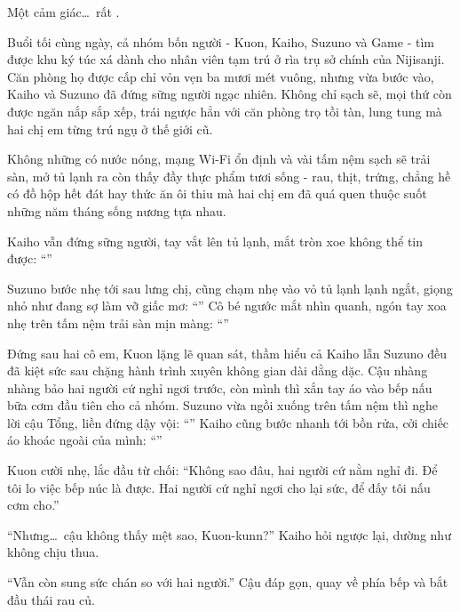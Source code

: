\documentclass[../main.tex]{subfiles}
\begin{document}
Một cảm giác\dots\ rất \hll.

\ct

Buổi tối cùng ngày, cả nhóm bốn người - Kuon, Kaiho, Suzuno và Game - tìm được khu ký túc xá dành cho nhân viên tạm trú ở rìa trụ sở chính của Nijisanji. Căn phòng họ được cấp chỉ vỏn vẹn ba mươi mét vuông, nhưng vừa bước vào, Kaiho và Suzuno đã đứng sững người ngạc nhiên. Không chỉ sạch sẽ, mọi thứ còn được ngăn nắp sắp xếp, trái ngược hẳn với căn phòng trọ tồi tàn, lung tung mà hai chị em từng trú ngụ ở thế giới cũ.

Không những có nước nóng, mạng Wi-Fi ổn định và vài tấm nệm sạch sẽ trải sàn, mở tủ lạnh ra còn thấy đầy thực phẩm tươi sống - rau, thịt, trứng, chẳng hề có đồ hộp hết đát hay thức ăn ôi thiu mà hai chị em đã quá quen thuộc suốt những năm tháng sống nương tựa nhau.

Kaiho vẫn đứng sững người, tay vắt lên tủ lạnh, mắt tròn xoe không thể tin được: ``''

Suzuno bước nhẹ tới sau lưng chị, cũng chạm nhẹ vào vỏ tủ lạnh lạnh ngắt, giọng nhỏ như đang sợ làm vỡ giấc mơ: ``'' Cô bé ngước mắt nhìn quanh, ngón tay xoa nhẹ trên tấm nệm trải sàn mịn màng: ``''

Đứng sau hai cô em, Kuon lặng lẽ quan sát, thầm hiểu cả Kaiho lẫn Suzuno đều đã kiệt sức sau chặng hành trình xuyên không gian dài dằng dặc. Cậu nhàng nhàng bảo hai người cứ nghỉ ngơi trước, còn mình thì xắn tay áo vào bếp nấu bữa cơm đầu tiên cho cả nhóm. Suzuno vừa ngồi xuống trên tấm nệm thì nghe lời cậu Tổng, liền đứng dậy vội: ``'' Kaiho cũng bước nhanh tới bồn rửa, cởi chiếc áo khoác ngoài của mình: ``''

Kuon cười nhẹ, lắc đầu từ chối: ``Không sao đâu, hai người cứ nằm nghỉ đi. Để tôi lo việc bếp núc là được. Hai người cứ nghỉ ngơi cho lại sức, để đấy tôi nấu cơm cho.''

``Nhưng\dots\ cậu không thấy mệt sao, Kuon-kunn?'' Kaiho hỏi ngược lại, dường như không chịu thua.

``Vẫn còn sung sức chán so với hai người.'' Cậu đáp gọn, quay về phía bếp và bắt đầu thái rau củ.
\end{document}
